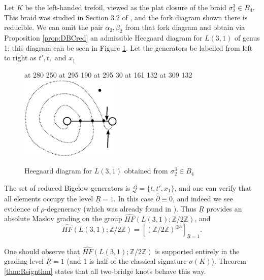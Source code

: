 \documentclass[11pt]{article}
\theoremstyle{plain} \newtheorem{thm}{Theorem}[subsection]
\theoremstyle{plain} \newtheorem{cor}[thm]{Corollary}
\theoremstyle{plain} \newtheorem{prop}[thm]{Proposition}
\theoremstyle{plain} \newtheorem{conj}[thm]{Conjecture}
\theoremstyle{plain} \newtheorem{lem}[thm]{Lemma}
\theoremstyle{definition} \newtheorem{df}[thm]{Definition}
\theoremstyle{remark} \newtheorem{rmk}[thm]{Remark}
\theoremstyle{remark} \newtheorem{obs}[thm]{Observation}
\newcommand{\B}[1]{B_{#1} }
\newcommand{\G}{\mathcal{G}}
\newcommand{\del}{\partial}
\newcommand{\red}[1]{\underline{#1}}
\newcommand{\ah}{\widehat{\alpha}}
\newcommand{\bh}{\widehat{\beta}}
\newcommand{\Zcaltwo}{\mathbb{Z}/2\mathbb{Z}}
\numberwithin{equation}{section}
\begin{document}
Let $K$ be the left-handed trefoil, viewed as the plat closure of the braid $\sigma_{2}^{3} \in \B{4}$.  This braid was studied in Section 3.2 of \cite{et:R}, and the fork diagram shown there is reducible.  We can omit the pair $\alpha_{2},\beta_{2}$ from that fork diagram and obtain via Proposition \ref{prop:DBCred} an admissible Heegaard diagram for $L(3,1)$ of genus 1; this diagram can be seen in Figure \ref{fig:exhdred}.  Let the generators be labelled from left to right as $t', t, \text{ and } x_{1}$
\begin{figure}[h!]
\centering
\begin{minipage}[c]{.45\linewidth}
\small
\pinlabel* {$+\infty$} at 280 250
\pinlabel* {$\ah_{1}$} at 295 190
\pinlabel* {$\bh_{1}$} at 295 30
 at 161 132
 at  309 132
\endlabellist 
\includegraphics[height = 40mm]{ExHDred}\end{minipage}
\begin{minipage}[c]{.45\linewidth}
\caption{Heegaard diagram  for $L(3,1)$ obtained from $\sigma_{2}^{3} \in \B{4}$}
\label{fig:exhdred}
\end{minipage}
\end{figure}

The set of reduced Bigelow generators is $\red{\G} = \{ t, t', x_{1} \}$, and one can verify that all elements occupy the level $\red{R} = 1.$  In this case $\widehat{\del} \equiv 0$, and indeed we see evidence of $\rho$-degeneracy (which was already found in \cite{et:R}).  Thus $\red{R}$ provides an absolute Maslov grading on the group $\widehat{HF}\left(L(3,1); \Zcaltwo\right)$, and
\begin{equation*}
\widehat{HF}\left(L(3,1); \Zcaltwo\right) = \left[\left( \Zcaltwo \right)^{\oplus 3}\right]_{\red{R}=1}.
\end{equation*}

One should observe that $\widehat{HF}(L(3,1); \mathbb{Z}/2\mathbb{Z})$ is supported entirely in the grading level $\red{R} = 1$ (and 1 is half of the classical signature $\sigma(K)$).  Theorem \ref{thm:Rsignthm} states that all two-bridge knots behave this way.
\end{document}
